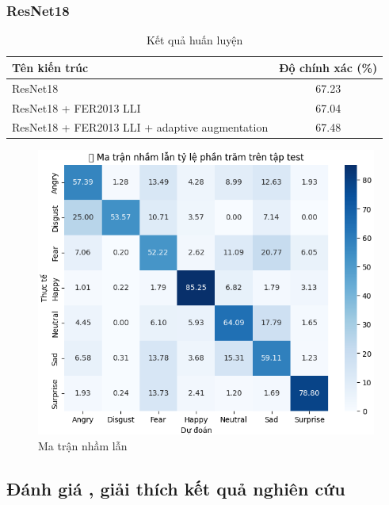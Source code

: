 \subsubsection{ResNet18}

\begin{table}[H]
\centering
{}  %
\begin{tabular}{|>{\raggedright\arraybackslash}p{6cm}|c|}
\hline
\rowcolor{gray!40} \textbf{Tên kiến trúc} & \textbf{Độ chính xác (\%)} \\
\hline
ResNet18 & 67.23 \\
ResNet18 + FER2013 LLI & 67.04 \\
ResNet18 + FER2013 LLI + adaptive augmentation & 67.48 \\
\hline
\end{tabular}
\caption{Kết quả huấn luyện}
\end{table}

\begin{figure}[H]
\centering
\includegraphics[width=1\textwidth]{img/confusionMatrixResnet18.png}  %
\caption{Ma trận nhầm lẫn}
\end{figure}
    
    

\subsection{Đánh giá  , giải thích kết quả nghiên  cứu}

